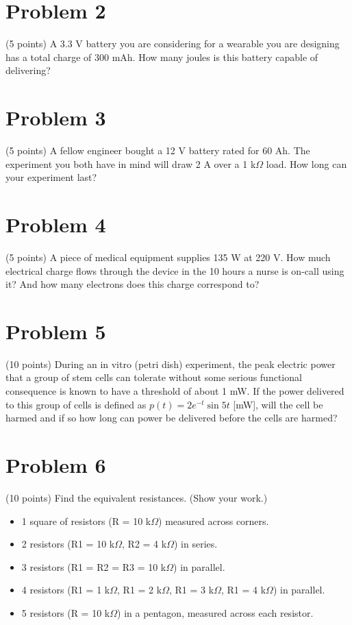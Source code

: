 \documentclass[11pt]{book}
\begin{document}
\newpage

\section{Problem 2}
(5 points) A  3.3 V battery you are considering for a wearable you are designing has a total charge of 300 mAh. How many joules is this battery capable of delivering?

\section{Problem 3}
(5 points) A fellow engineer bought a 12 V battery rated for 60 Ah. The experiment you both have in mind will draw 2 A over a 1 k$\Omega$ load. How long can your experiment last?

\section{Problem 4}
(5 points) A piece of medical equipment supplies 135 W at 220 V. How much electrical charge flows through the device in the 10 hours a nurse is on-call using it? And how many electrons does this charge correspond to?


\section{Problem 5}
(10 points) During an in vitro (petri dish) experiment, the peak electric power that a group of stem cells can tolerate without some serious functional consequence is known to have a threshold of about 1 mW. If the power delivered to this group of cells is defined as $p(t) = 2e^{-t}\sin 5t$ [mW], will the cell be harmed and if so how long can power be delivered before the cells are harmed?

\section{Problem 6}
(10 points) Find the equivalent resistances. (Show your work.)
\begin{itemize}
	\item 1 square of resistors (R = 10 k$\Omega$) measured across corners.
	\item 2 resistors (R1 = 10 k$\Omega$, R2 = 4 k$\Omega$) in series.
	\item 3 resistors (R1 = R2 = R3 = 10 k$\Omega$) in parallel.
	\item 4 resistors (R1 = 1 k$\Omega$, R1 = 2 k$\Omega$, R1 = 3 k$\Omega$, R1 = 4 k$\Omega$) in parallel.
	\item 5 resistors (R = 10 k$\Omega$) in a pentagon, measured across each resistor.
\end{itemize}
\end{document}
